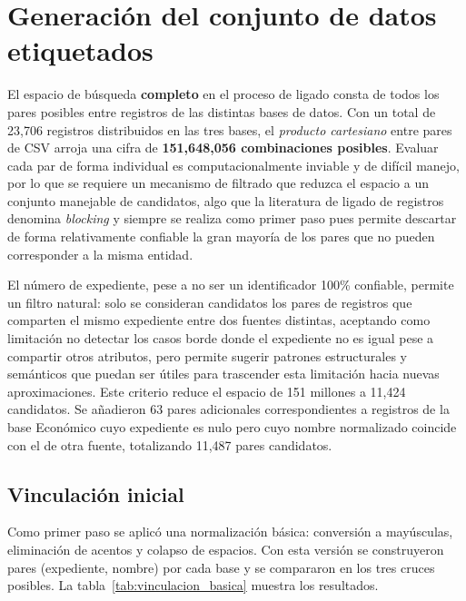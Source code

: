 \section{Generación del conjunto de datos etiquetados}

El espacio de búsqueda \textbf{completo} en el proceso de ligado consta de todos los pares posibles entre registros de las distintas bases de datos. Con un total de 23,706 registros distribuidos en las tres bases, el \textit{producto cartesiano} entre pares de CSV arroja una cifra de \textbf{151,648,056 combinaciones posibles}. Evaluar cada par de forma individual es computacionalmente inviable y de difícil manejo, por lo que se requiere un mecanismo de filtrado que reduzca el espacio a un conjunto manejable de candidatos, algo que la literatura de ligado de registros denomina \emph{blocking} y siempre se realiza como primer paso pues permite descartar de forma relativamente confiable la gran mayoría de los pares que no pueden corresponder a la misma entidad.

El número de expediente, pese a no ser un identificador 100\% confiable, permite un filtro natural: solo se consideran candidatos los pares de registros que comparten el mismo expediente entre dos fuentes distintas, aceptando como limitación no detectar los casos borde donde el expediente no es igual pese a compartir otros atributos, pero permite sugerir patrones estructurales y semánticos que puedan ser útiles para trascender esta limitación hacia nuevas aproximaciones. Este criterio reduce el espacio de 151 millones a 11,424 candidatos. Se añadieron 63 pares adicionales correspondientes a registros de la base Económico cuyo expediente es nulo pero cuyo nombre normalizado coincide con el de otra fuente, totalizando 11,487 pares candidatos.

\subsection{Vinculación inicial}

Como primer paso se aplicó una normalización básica: conversión a mayúsculas, eliminación de acentos y colapso de espacios. Con esta versión se construyeron pares (expediente, nombre) por cada base y se compararon en los tres cruces posibles. La tabla~\ref{tab:vinculacion_basica} muestra los resultados.

